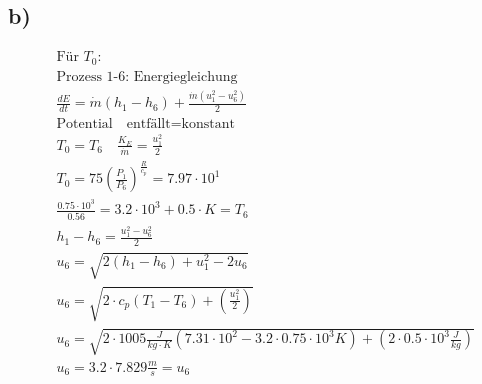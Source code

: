 

\subsection*{b)}

\begin{align*}
    &\text{Für } T_0: \\
    &\text{Prozess 1-6: Energiegleichung} \\
    &\frac{dE}{dt} = \dot{m} (h_1 - h_6) + \frac{\dot{m} (u_1^2 - u_6^2)}{2} \\
    &\text{Potential} \quad \text{entfällt} = \text{konstant} \\
    &T_0 = T_6 \quad \frac{K_E}{\dot{m}} = \frac{u_1^2}{2} \\
    &T_0 = 75 \left( \frac{P_1}{P_6} \right)^{\frac{R}{c_p}} = 7.97 \cdot 10^1 \\
    &\frac{0.75 \cdot 10^3}{0.56} = 3.2 \cdot 10^3 + 0.5 \cdot K = T_6 \\
    &h_1 - h_6 = \frac{u_1^2 - u_6^2}{2} \\
    &u_6 = \sqrt{2 \left( h_1 - h_6 \right) + u_1^2 - 2u_6} \\
    &u_6 = \sqrt{2 \cdot c_p (T_1 - T_6) + \left( \frac{u_1^2}{2} \right)} \\
    &u_6 = \sqrt{2 \cdot 1005 \frac{J}{kg \cdot K} \left( 7.31 \cdot 10^2 - 3.2 \cdot 0.75 \cdot 10^3 K \right) + \left( 2 \cdot 0.5 \cdot 10^3 \frac{J}{kg} \right)} \\
    &u_6 = 3.2 \cdot 7.829 \frac{m}{s} = u_6
\end{align*}

